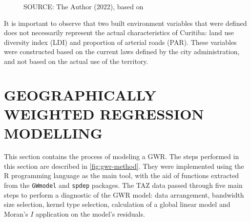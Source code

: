 \begin{figure}[!htbp]
\begin{subfigure}{0.5\textwidth}
    \end{subfigure}
    \label{fig:bsd_avi}
    \par SOURCE: The Author (2022), based on \textcite{IPPUC2018b,IPPUC2020a, IBGE2010}
\end{figure}


It is important to observe that two built environment variables that were defined does not necessarily represent the actual characteristics of Curitiba: land use diversity index (LDI) and proportion of arterial roads (PAR). These variables were constructed based on the current laws defined by the city administration, and not based on the actual use of the territory. 

\section{GEOGRAPHICALLY WEIGHTED REGRESSION MODELLING} \label{gwm}









This section contains the process of modeling a GWR. The steps performed in this section are described in \autoref{fig:gwr-method}. They were implemented using the R programming language as the main tool, with the aid of functions extracted from the \verb|GWmodel| \cite{Gollini2013} and \verb|spdep| \cite{Bivand2013} packages. The TAZ data passed through five main steps to perform a diagnostic of the GWR model: data arrangement, bandwidth size selection, kernel type selection, calculation of a global linear model and Moran's $I$ application on the model's residuals. 

